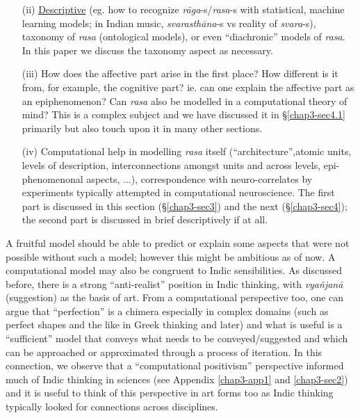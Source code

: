 \begin{itemize}
\item[(ii)] \underline{Descriptive} (eg. how to recognize \textsl{rāga}-s/\textsl{rasa}-s with statistical, machine learning models; in Indian music, \textsl{svarasthāna}-s vs reality of \textsl{svara}-s), taxonomy of \textsl{rasa} (ontological models), or even “diachronic” models of \textsl{rasa}. In this paper we discuss the taxonomy aspect as necessary.

\item[(iii)] How does the affective part arise in the first place? How different is it from, for example, the cognitive part? ie. can one explain the affective part as an epiphenomenon? Can \textsl{rasa} also be modelled in a computational theory of mind? This is a complex subject and we have discussed it in \S\ref{chap3-sec4.1} primarily but also touch upon it in many other sections.

\item[(iv)] Computational help in modelling \textsl{rasa} itself (“architecture”,\break atomic units, levels of description, interconnections amongst units and across levels, epi-phenomenonal aspects, ...), correspondence with neuro-correlates by experiments typically attempted in computational neuroscience. The first part is discussed in this section (\S\ref{chap3-sec3}) and the next (\S\ref{chap3-sec4}); the second part is discussed in brief descriptively if at all.
\end{itemize}

A fruitful model should be able to predict or explain some aspects that were not possible without such a model; however this might be ambitious as of now. A computational model may also be congruent to Indic sensibilities. As discussed before, there is a strong “anti-realist” position in Indic thinking, with \textsl{vyañjanā} (suggestion) as the basis of art. From a computational perspective too, one can argue that “perfection” is a chimera especially in complex domains (such as perfect shapes and the like in Greek thinking and later) and what is useful is a “sufficient” model that conveys what needs to be conveyed/suggested and which can be approached or approximated through a process of iteration. In this connection, we observe that a “computational positivism” perspective informed much of Indic thinking in sciences (see Appendix \ref{chap3-app1} and \ref{chap3-sec2}) and it is useful to think of this perspective in art forms too as Indic thinking typically looked for connections across disciplines.

